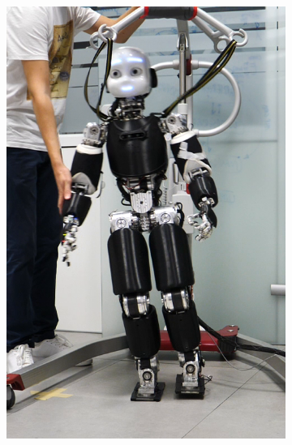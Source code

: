 \begin{figure}[!t]
\begin{subfigure}[b]{0.32\textwidth}
        \includegraphics[width=\columnwidth]{chapter_centroidal_mpc/figures/icub2.png}
    \end{subfigure}
    \hfill
     \begin{subfigure}[b]{0.32\textwidth}
        \centering

\end{subfigure}
\end{figure}
